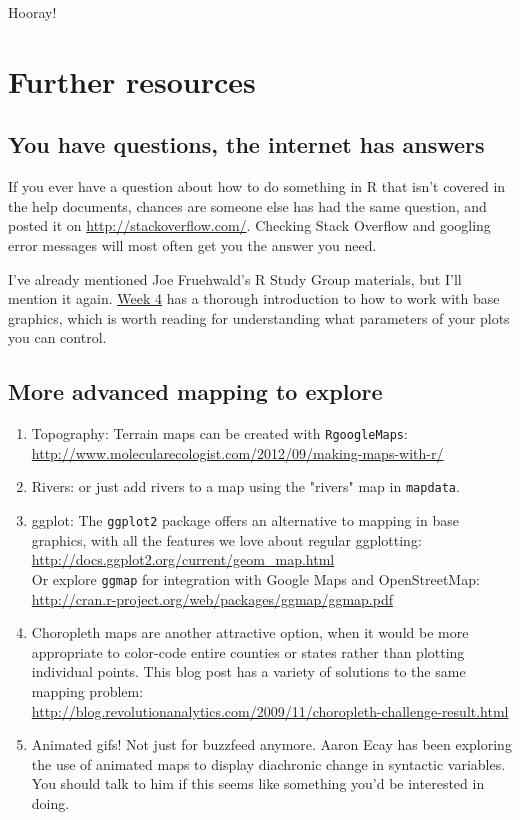 \documentclass[12pt]{article}
\begin{document}
Hooray!

\clearpage
\section{Further resources}
\subsection{You have questions, the internet has answers}
If you ever have a question about how to do something in R that isn't covered in the help documents, chances are someone else has had the same question, and posted it on \url{http://stackoverflow.com/}. Checking Stack Overflow and googling error messages will most often get you the answer you need.

I've already mentioned Joe Fruehwald's R Study Group materials, but I'll mention it again. \href{http://www.ling.upenn.edu/~joseff/rstudy/week4.html}{Week 4} has a thorough introduction to how to work with base graphics, which is worth reading for understanding what parameters of your plots you can control.

\subsection{More advanced mapping to explore}
\begin{enumerate}
\item Topography: Terrain maps can be created with \texttt{RgoogleMaps}:\\ \url{http://www.molecularecologist.com/2012/09/making-maps-with-r/}
\item Rivers: or just add rivers to a map using the "rivers" map in \texttt{mapdata}.
\item ggplot: The \texttt{ggplot2} package offers an alternative to mapping in base graphics, with all the features we love about regular ggplotting:\\
\url{http://docs.ggplot2.org/current/geom_map.html}\\
Or explore \texttt{ggmap} for integration with Google Maps and OpenStreetMap:\\
\url{http://cran.r-project.org/web/packages/ggmap/ggmap.pdf}
\item Choropleth maps are another attractive option, when it would be more appropriate to color-code entire counties or states rather than plotting individual points. This blog post has a variety of solutions to the same mapping problem:\\
\url{http://blog.revolutionanalytics.com/2009/11/choropleth-challenge-result.html}
\item Animated gifs! Not just for buzzfeed anymore. Aaron Ecay has been exploring the use of animated maps to display diachronic change in syntactic variables. You should talk to him if this seems like something you'd be interested in doing.
\end{enumerate}
\end{document}
